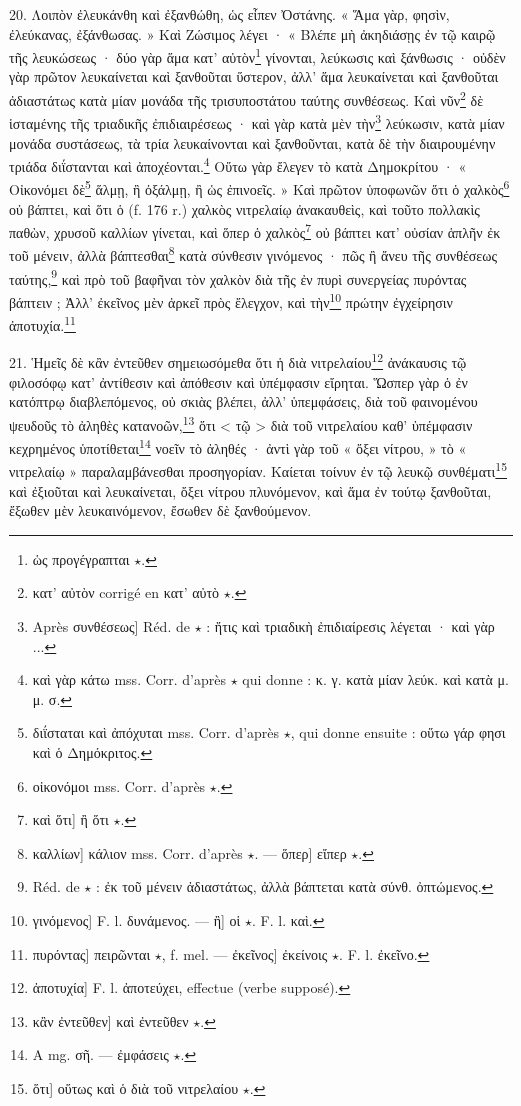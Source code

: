 \documentclass[landscape, a4paper, 11pt, oneside, polutonikogreek, french]{article}
\begin{document}
20. Λοιπὸν ἐλευκάνθη καὶ ἐξανθώθη, ὡς εἶπεν Ὀστάνης. « Ἅμα γὰρ, φησὶν, ἐλεύκανας, ἐξάνθωσας. » Καὶ Ζώσιμος λέγει · « Βλέπε μὴ ἀκηδιάσῃς ἐν τῷ καιρῷ τῆς λευκώσεως · δύο γὰρ ἅμα κατ' αὐτὸν\footnote{ὡς προγέγραπται $\star$.} γίνονται, λεύκωσις καὶ ξάνθωσις · οὐδὲν γὰρ πρῶτον λευκαίνεται καὶ ξανθοῦται ὕστερον, ἀλλ' ἅμα λευκαίνεται καὶ ξανθοῦται ἀδιαστάτως κατὰ μίαν μονάδα τῆς τρισυποστάτου ταύτης συνθέσεως. Καὶ νῦν\footnote{κατ' αὐτὸν corrigé en κατ' αὐτὸ $\star$.} δὲ ἱσταμένης τῆς τριαδικῆς ἐπιδιαιρέσεως · καὶ γὰρ κατὰ μὲν τὴν\footnote{Après συνθέσεως] Réd. de $\star$ : ἥτις καὶ τριαδικὴ ἐπιδιαίρεσις λέγεται · καὶ γὰρ ...} λεύκωσιν, κατὰ μίαν μονάδα συστάσεως, τὰ τρία λευκαίνονται καὶ ξανθοῦνται, κατὰ δὲ τὴν διαιρουμένην τριάδα διΐστανται καὶ ἀποχέονται.\footnote{καὶ γὰρ κάτω mss. Corr. d'après $\star$ qui donne : κ. γ. κατὰ μίαν λεύκ. καὶ κατὰ μ. μ. σ.} Οὕτω γὰρ ἔλεγεν τὸ κατὰ Δημοκρίτου · « Οἰκονόμει δὲ\footnote{διΐσταται καὶ ἀπόχυται mss. Corr. d'après $\star$, qui donne ensuite : οὕτω γάρ φησι καὶ ὁ Δημόκριτος.} ἅλμῃ, ἢ ὀξάλμῃ, ἢ ὡς ἐπινοεῖς. » Καὶ πρῶτον ὑποφωνῶν ὅτι ὁ χαλκὸς\footnote{οἰκονόμοι mss. Corr. d'après $\star$.} οὐ βάπτει, καὶ ὅτι ὁ (f. 176 r.) χαλκὸς νιτρελαίῳ ἀνακαυθεὶς, καὶ τοῦτο πολλακὶς παθὼν, χρυσοῦ καλλίων γίνεται, καὶ ὅπερ ὁ χαλκὸς\footnote{καὶ ὅτι] ἢ ὅτι $\star$.} οὐ βάπτει κατ' οὐσίαν ἁπλῆν ἐκ τοῦ μένειν, ἀλλὰ βάπτεσθαι\footnote{καλλίων] κάλιον mss. Corr. d'après $\star$. --- ὅπερ] εἴπερ $\star$.} κατὰ σύνθεσιν γινόμενος · πῶς ἢ ἄνευ τῆς συνθέσεως ταύτης,\footnote{Réd. de $\star$ : ἐκ τοῦ μένειν ἀδιαστάτως, ἀλλὰ βάπτεται κατὰ σύνθ. ὀπτώμενος.} καὶ πρὸ τοῦ βαφῆναι τὸν χαλκὸν διὰ τῆς ἐν πυρὶ συνεργείας πυρόντας βάπτειν ; Ἀλλ' ἐκεῖνος μὲν ἀρκεῖ πρὸς ἔλεγχον, καὶ τὴν\footnote{γινόμενος] F. l. δυνάμενος. --- ἢ] οἱ $\star$. F. l. καὶ.} πρώτην ἐγχείρησιν ἀποτυχία.\footnote{πυρόντας] πειρῶνται $\star$, f. mel. --- ἐκεῖνος] ἐκείνοις $\star$. F. l. ἐκεῖνο.}

21. Ἡμεῖς δὲ κἂν ἐντεῦθεν σημειωσόμεθα ὅτι ἡ διὰ νιτρελαίου\footnote{ἀποτυχία] F. l. ἀποτεύχει, effectue (verbe supposé).} ἀνάκαυσις τῷ φιλοσόφῳ κατ' ἀντίθεσιν καὶ ἀπόθεσιν καὶ ὑπέμφασιν εἴρηται. Ὥσπερ γὰρ ὁ ἐν κατόπτρῳ διαβλεπόμενος, οὐ σκιὰς βλέπει, ἀλλ' ὑπεμφάσεις, διὰ τοῦ φαινομένου ψευδοῦς τὸ ἀληθὲς κατανοῶν,\footnote{κἂν ἐντεῦθεν] καὶ ἐντεῦθεν $\star$.} ὅτι < τῷ > διὰ τοῦ νιτρελαίου καθ' ὑπέμφασιν κεχρημένος ὑποτίθεται\footnote{A mg. σῆ. --- ἐμφάσεις $\star$.} νοεῖν τὸ ἀληθές · ἀντὶ γὰρ τοῦ « ὄξει νίτρου, » τὸ « νιτρελαίῳ » παραλαμβάνεσθαι προσηγορίαν. Καίεται τοίνυν ἐν τῷ λευκῷ συνθέματι\footnote{ὅτι] οὕτως καὶ ὁ διὰ τοῦ νιτρελαίου $\star$.} καὶ ἐξιοῦται καὶ λευκαίνεται, ὄξει νίτρου πλυνόμενον, καὶ ἅμα ἐν τούτῳ ξανθοῦται, ἔξωθεν μὲν λευκαινόμενον, ἔσωθεν δὲ ξανθούμενον.
\end{document}
